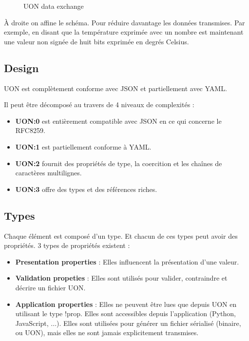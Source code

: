 \documentclass[
    iict, %
    il, %
]{heig-tb}
\begin{document}
\begin{figure}[!h]
    \begin{center}
    \end{center}
    \caption[UON data exchange]{\label{data-exchange}UON data exchange}
\end{figure}

À droite on affine le schéma. Pour réduire davantage les données transmises.
Par exemple, en disant que la température exprimée avec un nombre est maintenant une valeur non signée de huit bits exprimée en degrés Celsius.

\subsection{Design}
UON est complètement conforme avec JSON et partiellement avec YAML.

Il peut être décomposé au travers de 4 niveaux de complexités :
\begin{itemize}
    \item \textbf{UON:0} est entièrement compatible avec JSON en ce qui concerne le RFC8259.
    \item \textbf{UON:1} est partiellement conforme à YAML.
    \item \textbf{UON:2} fournit des propriétés de type, la coercition et les chaînes de caractères multilignes.
    \item \textbf{UON:3} offre des types et des références riches.
\end{itemize}

\subsection{Types}
Chaque élément est composé d'un type. Et chacun de ces types peut avoir des propriétés.
3 types de propriétés existent :
\begin{itemize}
    \item \textbf{Presentation properties} : Elles influencent la présentation d'une valeur.
    \item \textbf{Validation propeties} : Elles sont utilisés pour valider, contraindre et décrire un fichier UON.
    \item \textbf{Application properties} : Elles ne peuvent être lues que depuis UON en utilisant le type !prop. Elles sont accessibles depuis l'application (Python, JavaScript, ...). Elles sont utilisées pour générer un fichier sérialisé (binaire, ou UON), mais elles ne sont jamais explicitement transmises.
\end{itemize}
\end{document}
